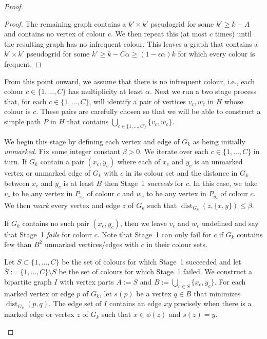 \documentclass{patmorin}
\DeclareMathOperator{\dist}{dist}
\begin{document}
\begin{proof}
\begin{proof}
    The remaining graph contains a $k'\times k'$ pseudogrid for some $k' \ge k-A$ and contains no vertex of colour $c$.  We then repeat this (at most $c$ times) until the resulting graph has no infrequent colour.  This leaves a graph that contains a $k'\times k'$ pseudogrid for some $k'\ge k-C\alpha\ge(1-\epsilon \alpha)k$ for which every colour is frequent.
  \end{proof}

  From this point onward, we assume that there is no infrequent colour, i.e., each colour $c\in\{1,\ldots,C\}$ has multiplicity at least $\alpha$.  Next we run a two stage process that, for each $c\in\{1,\ldots,C\}$, will identify a pair of vertices $v_c,w_c$ in $H$ whose colour is $c$.  These pairs are carefully chosen so that we will be able to construct a simple path $P$ in $H$ that contains $\bigcup_{c\in\{1,\ldots,C\}} \{v_c,w_c\}$.  
  
  \begin{compactenum}[{Stage} 1.]
    \item We begin this stage by defining each vertex and edge of $G_k$ as being initially \emph{unmarked}.  Fix some integer constant $\beta>0$.  We iterate over each $c\in\{1,\ldots,C\}$ in turn.  If $G_k$ contain a pair $(x_c,y_c)$ where each of $x_c$ and $y_c$ is an unmarked vertex or unmarked edge of $G_k$ with $c$ in its colour set and the distance in $G_k$ between $x_c$ and $y_c$ is at least $B$ then Stage~1 \emph{succeeds} for $c$.  In this case, we take $v_c$ to be any vertex in $P_{x_c}$ of colour $c$ and $w_c$ to be any vertex in $P_{y_c}$ of colour $c$.  We then \emph{mark} every vertex and edge $z$ of $G_k$ such that $\dist_{G_k}(z, \{x,y\})\le \beta$.
    
    If $G_k$ contains no such pair $(x_c,y_c)$, then we leave $v_c$ and $w_c$ undefined and say that Stage~1 \emph{fails} for colour $c$.  Note that Stage~1 can only fail for $c$ if $G_k$ contains few than $B^2$ unmarked vertices/edges with $c$ in their colour sets.

    \item Let $S\subset\{1,\ldots,C\}$ be the set of colours for which Stage~1 succeeded and let $\overline{S}:=\{1,\ldots,C\}\setminus S$ be the set of colours for which Stage~1 failed.  We construct a bipartite graph $I$ with vertex parts $A:=\overline{S}$ and $B:=\bigcup_{c\in S}\{x_c,y_c\}$.   For each marked vertex or edge $p$ of $G_k$, let $s(p)$ be a vertex $q\in B$ that minimizes $\dist_{G_k}(p,q)$.  The edge set of $I$ contains an edge $xy$ precisely when there is a marked edge or vertex $z$ of $G_k$ such that $x\in\phi(z)$ and $s(z)=y$.
    

\end{compactenum}
\end{proof}
\end{document}
